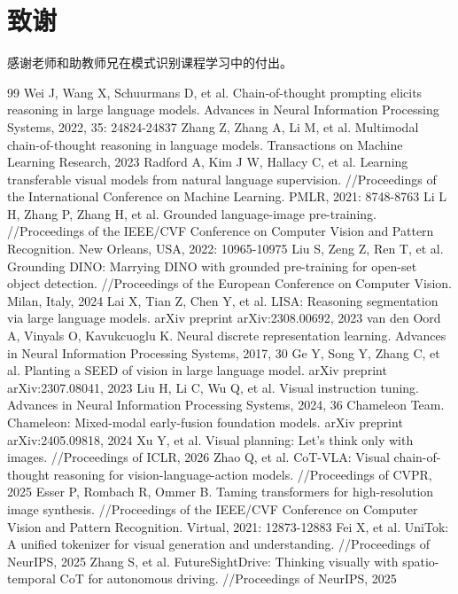 \documentclass[twocolumn]{ctexart}
\begin{document}
\section*{致\quad 谢}
感谢老师和助教师兄在模式识别课程学习中的付出。
\begin{thebibliography}{99}
 Wei J, Wang X, Schuurmans D, et al. Chain-of-thought prompting elicits reasoning in large language models. Advances in Neural Information Processing Systems, 2022, 35: 24824-24837
 Zhang Z, Zhang A, Li M, et al. Multimodal chain-of-thought reasoning in language models. Transactions on Machine Learning Research, 2023
 Radford A, Kim J W, Hallacy C, et al. Learning transferable visual models from natural language supervision. //Proceedings of the International Conference on Machine Learning. PMLR, 2021: 8748-8763
 Li L H, Zhang P, Zhang H, et al. Grounded language-image pre-training. //Proceedings of the IEEE/CVF Conference on Computer Vision and Pattern Recognition. New Orleans, USA, 2022: 10965-10975
 Liu S, Zeng Z, Ren T, et al. Grounding DINO: Marrying DINO with grounded pre-training for open-set object detection. //Proceedings of the European Conference on Computer Vision. Milan, Italy, 2024
 Lai X, Tian Z, Chen Y, et al. LISA: Reasoning segmentation via large language models. arXiv preprint arXiv:2308.00692, 2023
 van den Oord A, Vinyals O, Kavukcuoglu K. Neural discrete representation learning. Advances in Neural Information Processing Systems, 2017, 30
 Ge Y, Song Y, Zhang C, et al. Planting a SEED of vision in large language model. arXiv preprint arXiv:2307.08041, 2023
 Liu H, Li C, Wu Q, et al. Visual instruction tuning. Advances in Neural Information Processing Systems, 2024, 36
 Chameleon Team. Chameleon: Mixed-modal early-fusion foundation models. arXiv preprint arXiv:2405.09818, 2024
 Xu Y, et al. Visual planning: Let's think only with images. //Proceedings of ICLR, 2026
 Zhao Q, et al. CoT-VLA: Visual chain-of-thought reasoning for vision-language-action models. //Proceedings of CVPR, 2025
 Esser P, Rombach R, Ommer B. Taming transformers for high-resolution image synthesis. //Proceedings of the IEEE/CVF Conference on Computer Vision and Pattern Recognition. Virtual, 2021: 12873-12883
 Fei X, et al. UniTok: A unified tokenizer for visual generation and understanding. //Proceedings of NeurIPS, 2025
 Zhang S, et al. FutureSightDrive: Thinking visually with spatio-temporal CoT for autonomous driving. //Proceedings of NeurIPS, 2025
\end{thebibliography}

\balance
\end{document}
